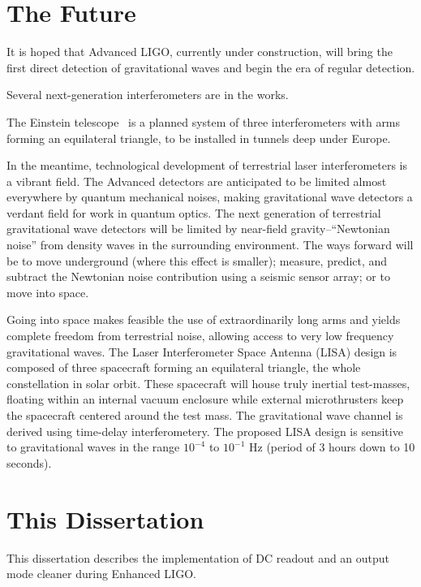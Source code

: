 \section{The Future}

It is hoped that Advanced LIGO, currently under construction, will
bring the first direct detection of gravitational waves and begin the
era of regular detection.

Several next-generation interferometers are in the works. 

The Einstein telescope~\cite{EinsteinTelescopeDesignStudy2011} is a
planned system of three interferometers with arms forming an
equilateral triangle, to be installed in tunnels deep under Europe.

In the meantime, technological development of terrestrial laser
interferometers is a vibrant field.  The Advanced detectors are
anticipated to be limited almost everywhere by quantum mechanical
noises, making gravitational wave detectors a verdant field for work
in quantum optics.  The next generation of terrestrial gravitational
wave detectors will be limited by near-field gravity--``Newtonian
noise'' from density waves in the surrounding environment.  The ways
forward will be to move underground (where this effect is smaller);
measure, predict, and subtract the Newtonian noise contribution using
a seismic sensor array; or to move into space.

Going into space makes feasible the use of extraordinarily long arms
and yields complete freedom from terrestrial noise, allowing access to
very low frequency gravitational waves.  The Laser Interferometer
Space Antenna (LISA) design is composed of three spacecraft forming an
equilateral triangle, the whole constellation in solar orbit.  These
spacecraft will house truly inertial test-masses, floating within an
internal vacuum enclosure while external microthrusters keep the
spacecraft centered around the test mass.  The gravitational wave
channel is derived using time-delay interferometery.  The proposed
LISA design is sensitive to gravitational waves in the range $10^{-4}$
to $10^{-1}$ Hz (period of 3 hours down to 10 seconds).

\section{This Dissertation}

This dissertation describes the implementation of DC readout and an
output mode cleaner during Enhanced LIGO.

